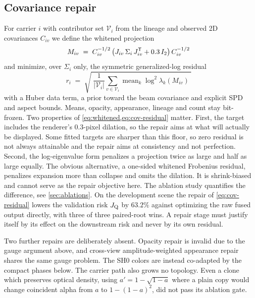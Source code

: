 \subsection{Covariance repair}
\label{sec:cov-repair}

For carrier $i$ with contributor set $\mathcal{V}_i$ from the lineage and observed 2D
covariances $C_{iv}$ we define the whitened projection
\begin{equation}
  M_{iv} \;=\; C_{iv}^{-1/2}\,\big(J_{iv}\, \Sigma_i\, J_{iv}^{\mathsf{T}} + 0.3\, I_2\big)\,
               C_{iv}^{-1/2}
  \label{eq:whitened}
\end{equation}
and minimize, over $\Sigma_i$ only, the symmetric generalized-log residual
\begin{equation}
  r_i \;=\; \sqrt{\;\frac{1}{|\mathcal{V}_i|}\sum_{v \in \mathcal{V}_i}
        \operatorname{mean}_k \log^2 \lambda_k(M_{iv})\;}
  \label{eq:cov-residual}
\end{equation}
with a Huber data term, a prior toward the beam covariance and explicit SPD and aspect
bounds.  Means, opacity, appearance, lineage and count stay bit-frozen.  Two properties
of \cref{eq:whitened,eq:cov-residual} matter.  First, the target includes the renderer's
$0.3$-pixel dilation, so the repair aims at what will actually be displayed.  Some fitted
targets are sharper than this floor, so zero residual is not always attainable and the
repair aims at consistency and not perfection.  Second, the log-eigenvalue form penalizes
a projection twice as large and half as large equally.  The obvious alternative, a
one-sided whitened Frobenius residual, penalizes expansion more than collapse and omits
the dilation.  It is shrink-biased and cannot serve as the repair objective here.  The
ablation study quantifies the difference, see \cref{sec:ablations}.  On the development
scene the repair of \cref{eq:cov-residual} lowers the validation risk $J_{\mathrm{Q}}$ by $63.2\%$
against optimizing the raw fused output directly, with three of three paired-root
wins.  A repair stage must justify itself by its effect
on the downstream risk and never by its own residual.

Two further repairs are deliberately absent.  Opacity repair is invalid due to the gauge
argument above, and cross-view amplitude-weighted appearance repair shares the same gauge
problem.  The SH0 colors are instead co-adapted by the compact phases below.  The carrier
path also grows no topology.  Even a clone which preserves optical density, using
$a' = 1 - \sqrt{1-a}$ where a plain copy would change coincident alpha from $a$ to
$1-(1-a)^2$, did not pass its ablation gate.

